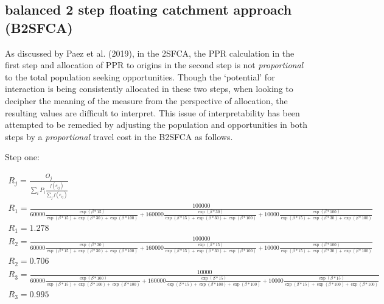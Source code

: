 \documentclass[]{elsarticle} %
\begin{document}
\hypertarget{balanced-2-step-floating-catchment-approach-b2sfca}{%
\subsection{balanced 2 step floating catchment approach
(B2SFCA)}\label{balanced-2-step-floating-catchment-approach-b2sfca}}

As discussed by Paez et al. (2019), in the 2SFCA, the PPR calculation in
the first step and allocation of PPR to origins in the second step is
not \emph{proportional} to the total population seeking opportunities.
Though the `potential' for interaction is being consistently allocated
in these two steps, when looking to decipher the meaning of the measure
from the perspective of allocation, the resulting values are difficult
to interpret. This issue of interpretability has been attempted to be
remedied by adjusting the population and opportunities in both steps by
a \emph{proportional} travel cost in the B2SFCA as follows.

Step one:

\begin{equation}
\begin{array}{l}

R_{j} = \frac{O_{j}}{\sum_i P_{i} \frac{f(c_{ij})}{\sum_j f(c_{ij})}}\\

R_{1} = \frac{100000}{60000 \frac{\exp(\beta *15)}{\exp(\beta *15) + \exp(\beta*30) + \exp(\beta*100)} + 160000 \frac{\exp(\beta *30)}{\exp(\beta *15) + \exp(\beta*30) + \exp(\beta*100)} + 10000 \frac{\exp(\beta *100)}{\exp(\beta *15) + \exp(\beta*30) + \exp(\beta*100)}}\\
R_{1} = 1.278\\

R_{2} = \frac{100000}{60000 \frac{\exp(\beta *30)}{\exp(\beta *15) + \exp(\beta*30) + \exp(\beta*100)} + 160000 \frac{\exp(\beta *15)}{\exp(\beta *15) + \exp(\beta*30) + \exp(\beta*100)} + 10000 \frac{\exp(\beta *100)}{\exp(\beta *15) + \exp(\beta*30) + \exp(\beta*100)}}\\
R_{2} = 0.706\\

R_{3} = \frac{10000}{60000 \frac{\exp(\beta *100)}{\exp(\beta *15) + \exp(\beta*100) + \exp(\beta*100)} + 160000 \frac{\exp(\beta *15)}{\exp(\beta *15) + \exp(\beta*100) + \exp(\beta*100)} + 10000 \frac{\exp(\beta *15)}{\exp(\beta *15) + \exp(\beta*100) + \exp(\beta*100)}}\\
R_{3} = 0.995\\

\end{array}
\end{equation}
\end{document}
